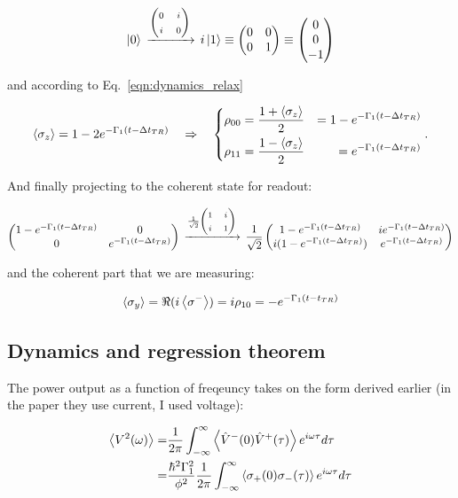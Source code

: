 \begin{enumerate}
   	   	\[
                  \Ket{0}
                  \,\xrightarrow{\text{\ensuremath{\begin{pmatrix}0&i\\i&0\end{pmatrix}}}}\,i\Ket{1}\equiv\begin{pmatrix}0&0\\0&1\end{pmatrix}\equiv\begin{pmatrix} 0\\0\\-1 \end{pmatrix}
                \]
   	
                \noindent and according to Eq.~\eqref{eqn:dynamics_relax}
   	
   	\[
          {\left\langle \sigma_z \right\rangle} = 1 -2e^{-\Gamma_1(t-\Delta t_{TR})} \quad\Rightarrow\quad \left\lbrace\begin{aligned}\rho_{00} &= \frac{1+{\left\langle \sigma_z \right\rangle} }{2} &= 1-e^{-\Gamma_1(t-\Delta t_{TR})}\\
            \rho_{11} &= \frac{1-{\left\langle \sigma_z \right\rangle} }{2} &= e^{-\Gamma_1(t-\Delta t_{TR})}\end{aligned}\right..
   	\]
   	
   	\noindent And finally projecting to the coherent state for readout:
   	
   	\[
          \begin{pmatrix}1-e^{-\Gamma_1(t-\Delta               t_{TR})}&0\\0&e^{-\Gamma_1(t-\Delta
              t_{TR})}\end{pmatrix}\,\xrightarrow{\text{$                                           \frac{1}{\sqrt{2}}
            $\ensuremath{\begin{pmatrix}1&i\\i&1\end{pmatrix}}}}\,\frac{1}{\sqrt{2}}\begin{pmatrix}1-e^{-\Gamma_1(t-\Delta
              t_{TR})}&ie^{-\Gamma_1(t-\Delta             t_{TR})}\\i(1-e^{-\Gamma_1(t-\Delta
              t_{TR})})&e^{-\Gamma_1(t-\Delta t_{TR})}\end{pmatrix}
   	\]
   	
   	\noindent and the coherent part that we are measuring:
   	
   	\[
          {\left\langle \sigma_y \right\rangle}  = \Re(i\left\langle \sigma^{-} \right\rangle)=i\rho_{10} = -e^{-\Gamma_1(t-t_{TR})}
   	\]
   	
   	
      \end{enumerate}

 \subsection{Dynamics and regression theorem}
 The power output as  a function of freqeuncy takes on the form  derived earlier (in the paper
 they use current, I used voltage):
  
 \[
   \begin{aligned}
     \left\langle V^2(\omega) \right\rangle = & \frac{1}{2\pi}\int_{-\infty}^{\infty}\left\langle \hat{V}^{-}(0)\hat{V}^{+}(\tau) \right\rangle e^{i\omega \tau}d\tau\\
     =                                                                                       &
     \frac{\hbar^2\Gamma_1^{2}}{\phi^2}\frac{1}{2\pi}\int_{-\infty}^{\infty}\left\langle \sigma_{+}(0)\sigma_{-}(\tau) \right\rangle e^{i\omega
       \tau}d\tau
   \end{aligned}
 \]
  
  
\newpage